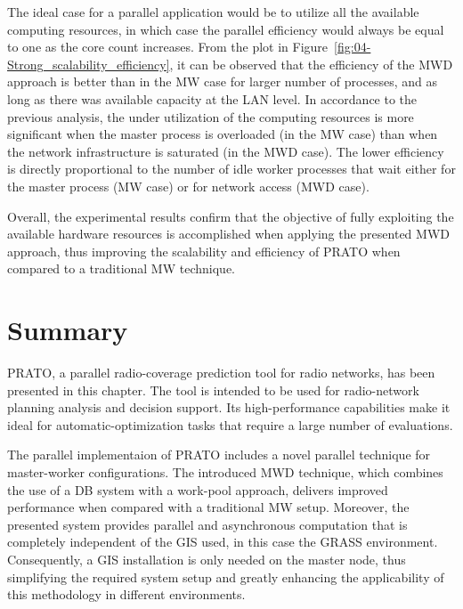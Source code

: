 The ideal case for a parallel application would be to utilize all
the available computing resources, in which case the parallel efficiency
would always be equal to one as the core count increases. From the
plot in Figure~\ref{fig:04-Strong_scalability_efficiency}, it can
be observed that the efficiency of the MWD approach is better than
in the MW case for larger number of processes, and as long as there
was available capacity at the LAN level. In accordance to the previous
analysis, the under utilization of the computing resources is more
significant when the master process is overloaded (in the MW case)
than when the network infrastructure is saturated (in the MWD case).
The lower efficiency is directly proportional to the number of idle
worker processes that wait either for the master process (MW case)
or for network access (MWD case).

Overall, the experimental results confirm that the objective of fully
exploiting the available hardware resources is accomplished when applying
the presented MWD approach, thus improving the scalability and efficiency
of PRATO when compared to a traditional MW technique.




\section{Summary \label{sec:04-Summary}}

PRATO, a parallel radio-coverage prediction tool for radio networks,
has been presented in this chapter. The tool is intended to be used
for radio-network planning analysis and decision support. Its high-performance
capabilities make it ideal for automatic-optimization tasks that require
a large number of evaluations.

The parallel implementaion of PRATO includes a novel parallel technique
for master-worker configurations. The introduced MWD technique, which
combines the use of a DB system with a work-pool approach, delivers
improved performance when compared with a traditional MW setup. Moreover,
the presented system provides parallel and asynchronous computation
that is completely independent of the GIS used, in this case the GRASS
environment. Consequently, a GIS installation is only needed on the
master node, thus simplifying the required system setup and greatly
enhancing the applicability of this methodology in different environments.

